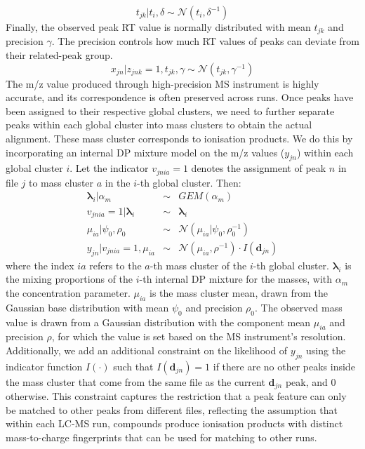 \begin{equation}
	t_{jk} \vert t_{i},\delta\sim\mathcal{N}(t_{i},\delta^{-1})\label{eq:draw_tik}
\end{equation}
Finally, the observed peak RT value is normally distributed with mean $t_{jk}$ and precision $\gamma$. The precision controls how much RT values of peaks can deviate from their related-peak group. 
\begin{equation}
	x_{jn} \vert z_{jnk}=1,t_{jk},\gamma\sim\mathcal{N}(t_{jk},\gamma^{-1})\label{eq:peakdist}
\end{equation}
The m/z value produced through high-precision MS instrument is highly accurate, and its correspondence is often preserved across runs. Once peaks have been assigned to their respective global clusters, we need to further separate peaks within each global cluster into mass clusters to obtain the actual alignment. These mass cluster corresponds to ionisation products. We do this by incorporating an internal DP mixture model on the m/z values ($y_{jn}$) within each global cluster $i$. Let the
indicator $v_{jnia}=1$ denotes the assignment of peak $n$ in file $j$ to mass cluster $a$ in the $i$-th global cluster. Then: 
\begin{eqnarray}
	\boldsymbol{\lambda}_{i} \vert \alpha_{m} & \sim & GEM(\alpha_{m})\\
	v_{jnia}=1 \vert \boldsymbol{\lambda}_{i} & \sim & \boldsymbol{\lambda}_{i}\\
	\mu_{ia} \vert \psi_{0},\rho_{0} & \sim & \mathcal{N}(\mu_{ia} \vert \psi_{0},\rho_{0}^{-1})\\
	y_{jn} \vert v_{jnia}=1,\mu_{ia} & \sim & \mathcal{N}(\mu_{ia},\rho^{-1})\cdot I(\mathbf{d}_{jn})
\end{eqnarray}
where the index $ia$ refers to the $a$-th mass cluster of the $i$-th global cluster. $\boldsymbol{\lambda}_{i}$ is the mixing proportions of the $i$-th internal DP mixture for the masses, with $\alpha_{m}$ the concentration parameter. $\mu_{ia}$ is the mass cluster mean, drawn from the Gaussian base distribution with mean $\psi_{0}$ and precision $\rho_{0}$. The observed mass value is drawn from a Gaussian distribution with the component mean $\mu_{ia}$ and precision $\rho$, for which the value is set based on the MS instrument's resolution. Additionally, we add an additional constraint on the likelihood of $y_{jn}$ using the indicator function $I(\cdot)$ such that $I(\mathbf{d}_{jn})=1$ if there are no other peaks inside the mass cluster that come from the same file as the current $\mathbf{d}_{jn}$ peak, and $0$ otherwise. This constraint captures the restriction that a peak feature can only be matched to other peaks from different files, reflecting the assumption that within each LC-MS run, compounds produce ionisation products with distinct mass-to-charge fingerprints that can be used for matching to other runs.

